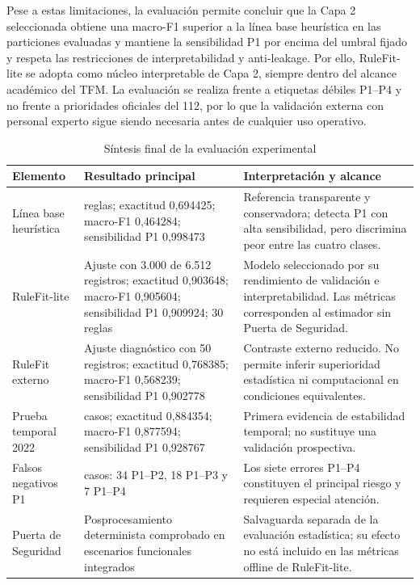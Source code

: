 Pese a estas limitaciones, la evaluación permite concluir que la Capa 2 seleccionada
obtiene una macro-F1 superior a la línea base heurística en las particiones evaluadas y mantiene la sensibilidad P1 por encima
del umbral fijado y respeta las restricciones de interpretabilidad y anti-leakage. Por
ello, RuleFit-lite se adopta como núcleo interpretable de Capa 2, siempre dentro del alcance académico del TFM. La evaluación se realiza
frente a etiquetas débiles P1--P4 y no frente a prioridades oficiales del 112, por lo
que la validación externa con personal experto sigue siendo necesaria antes de cualquier
uso operativo.

\clearpage
\begin{table}[p]
\centering
\caption{Síntesis final de la evaluación experimental}
\label{tab:9-sintesis-final}
\small
\begin{tabularx}{\textwidth}{|>{\RaggedRight\arraybackslash}p{3.0cm}|>{\RaggedRight\arraybackslash}p{4.2cm}|>{\RaggedRight\arraybackslash}X|}
\hline
\textbf{Elemento} & \textbf{Resultado principal} & \textbf{Interpretación y alcance} \\ \hline
Línea base heurística & 19 reglas; exactitud 0,694425; macro-F1 0,464284; sensibilidad P1 0,998473 & Referencia transparente y conservadora; detecta P1 con alta sensibilidad, pero discrimina peor entre las cuatro clases. \\ \hline
RuleFit-lite & Ajuste con 3.000 de 6.512 registros; exactitud 0,903648; macro-F1 0,905604; sensibilidad P1 0,909924; 30 reglas & Modelo seleccionado por su rendimiento de validación e interpretabilidad. Las métricas corresponden al estimador sin Puerta de Seguridad. \\ \hline
RuleFit externo & Ajuste diagnóstico con 50 registros; exactitud 0,768385; macro-F1 0,568239; sensibilidad P1 0,902778 & Contraste externo reducido. No permite inferir superioridad estadística ni computacional en condiciones equivalentes. \\ \hline
Prueba temporal 2022 & 735 casos; exactitud 0,884354; macro-F1 0,877594; sensibilidad P1 0,928767 & Primera evidencia de estabilidad temporal; no sustituye una validación prospectiva. \\ \hline
Falsos negativos P1 & 59 casos: 34 P1--P2, 18 P1--P3 y 7 P1--P4 & Los siete errores P1--P4 constituyen el principal riesgo y requieren especial atención. \\ \hline
Puerta de Seguridad & Posprocesamiento determinista comprobado en escenarios funcionales integrados & Salvaguarda separada de la evaluación estadística; su efecto no está incluido en las métricas offline de RuleFit-lite. \\ \hline

\end{tabularx}
\end{table}
